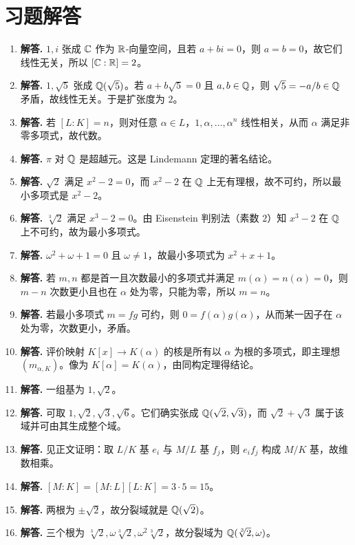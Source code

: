 \section*{习题解答}
\begin{enumerate}[label=\textbf{\arabic*.}, leftmargin=*, itemsep=1em]
\item \textbf{解答.} $1,i$ 张成 $\mathbb{C}$ 作为 $\mathbb{R}$-向量空间，且若 $a+bi=0$，则 $a=b=0$，故它们线性无关，所以 $[\mathbb{C}:\mathbb{R}]=2$。
\item \textbf{解答.} $1,\sqrt5$ 张成 $\mathbb{Q}(\sqrt5)$。若 $a+b\sqrt5=0$ 且 $a,b\in\mathbb{Q}$，则 $\sqrt5=-a/b\in\mathbb{Q}$ 矛盾，故线性无关。于是扩张度为 $2$。
\item \textbf{解答.} 若 $[L:K]=n$，则对任意 $\alpha\in L$，$1,\alpha,\dots,\alpha^n$ 线性相关，从而 $\alpha$ 满足非零多项式，故代数。
\item \textbf{解答.} $\pi$ 对 $\mathbb{Q}$ 是超越元。这是 Lindemann 定理的著名结论。
\item \textbf{解答.} $\sqrt2$ 满足 $x^2-2=0$，而 $x^2-2$ 在 $\mathbb{Q}$ 上无有理根，故不可约，所以最小多项式是 $x^2-2$。
\item \textbf{解答.} $\sqrt[3]{2}$ 满足 $x^3-2=0$。由 Eisenstein 判别法（素数 $2$）知 $x^3-2$ 在 $\mathbb{Q}$ 上不可约，故为最小多项式。
\item \textbf{解答.} $\omega^2+\omega+1=0$ 且 $\omega\ne1$，故最小多项式为 $x^2+x+1$。
\item \textbf{解答.} 若 $m,n$ 都是首一且次数最小的多项式并满足 $m(\alpha)=n(\alpha)=0$，则 $m-n$ 次数更小且也在 $\alpha$ 处为零，只能为零，所以 $m=n$。
\item \textbf{解答.} 若最小多项式 $m=fg$ 可约，则 $0=f(\alpha)g(\alpha)$，从而某一因子在 $\alpha$ 处为零，次数更小，矛盾。
\item \textbf{解答.} 评价映射 $K[x]\to K(\alpha)$ 的核是所有以 $\alpha$ 为根的多项式，即主理想 $(m_{\alpha,K})$。像为 $K[\alpha]=K(\alpha)$，由同构定理得结论。
\item \textbf{解答.} 一组基为 $1,\sqrt2$。
\item \textbf{解答.} 可取 $1,\sqrt2,\sqrt3,\sqrt6$。它们确实张成 $\mathbb{Q}(\sqrt2,\sqrt3)$，而 $\sqrt2+\sqrt3$ 属于该域并可由其生成整个域。
\item \textbf{解答.} 见正文证明：取 $L/K$ 基 $e_i$ 与 $M/L$ 基 $f_j$，则 $e_if_j$ 构成 $M/K$ 基，故维数相乘。
\item \textbf{解答.} $[M:K]=[M:L][L:K]=3\cdot5=15$。
\item \textbf{解答.} 两根为 $\pm\sqrt2$，故分裂域就是 $\mathbb{Q}(\sqrt2)$。
\item \textbf{解答.} 三个根为 $\sqrt[3]{2},\omega\sqrt[3]{2},\omega^2\sqrt[3]{2}$，故分裂域为 $\mathbb{Q}(\sqrt[3]{2},\omega)$。

\end{enumerate}
